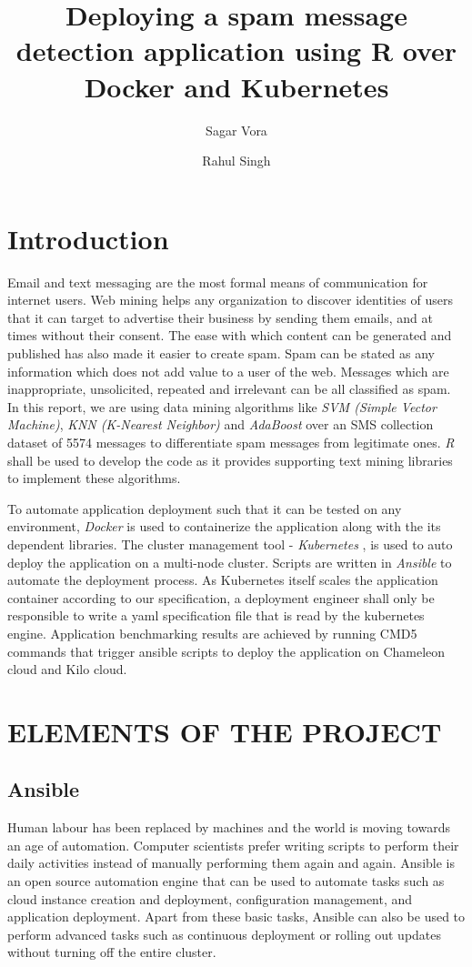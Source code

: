 \documentclass[9pt,twocolumn,twoside]{../../styles/osajnl}
\title{Deploying a spam message detection application using R over Docker and Kubernetes}
\author[1,*]{Sagar Vora}
\author[1,**]{Rahul Singh}
\affil[*]{School of Informatics and Computing, Bloomington, IN 47408, U.S.A.}
\affil[*]{Corresponding authors: vorasagar7@gmail.com, rahul\textunderscore singh919@yahoo.com}
\begin{document}
\maketitle

\section{Introduction}

Email and text messaging are the most formal means of communication
for internet users. Web mining helps any organization to discover
identities of users that it can target to advertise their business by
sending them emails, and at times without their consent. The ease with
which content can be generated and published has also made it easier
to create spam. Spam can be stated as any information which does not
add value to a user of the web. Messages which are inappropriate,
unsolicited, repeated and irrelevant can be all classified as spam. In
this report, we are using data mining algorithms like \emph{SVM
  (Simple Vector Machine)}, \emph{KNN (K-Nearest Neighbor)} and
\emph{AdaBoost} over an SMS collection dataset of 5574 messages to
differentiate spam messages from legitimate ones. \emph{R}
\cite{www-about-rproject} shall be used to develop the code as it
provides supporting text mining libraries to implement these
algorithms.

\noindent
To automate application deployment such that it can be tested on any
environment, \emph{Docker} \cite{www-docker-about} is used to
containerize the application along with the its dependent
libraries. The cluster management tool - \emph{Kubernetes}
\cite{www-kubernetes-home}, is used to auto deploy the application on
a multi-node cluster. Scripts are written in \emph{Ansible}
\cite{www-ansible} to automate the deployment process. As Kubernetes
itself scales the application container according to our
specification, a deployment engineer shall only be responsible to
write a yaml specification file that is read by the kubernetes
engine. Application benchmarking results are achieved by running CMD5
commands that trigger ansible scripts to deploy the application on
Chameleon cloud and Kilo cloud.


\section{ELEMENTS OF THE PROJECT}

\subsection{Ansible}
Human labour has been replaced by machines and the world is moving
towards an age of automation. Computer scientists prefer writing
scripts to perform their daily activities instead of manually
performing them again and again. Ansible is an open source automation
engine that can be used to automate tasks such as cloud instance
creation and deployment, configuration management, and application
deployment. Apart from these basic tasks, Ansible can also be used to
perform advanced tasks such as continuous deployment or rolling out
updates without turning off the entire cluster.
\end{document}
